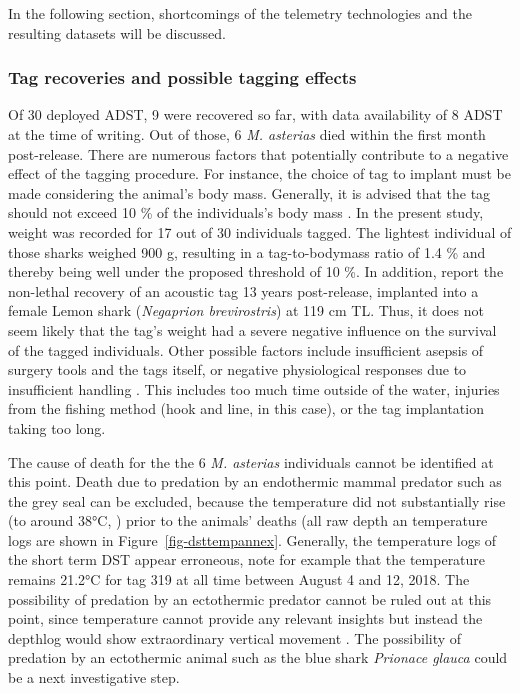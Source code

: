 \documentclass[
  authoryear,
  review,
  3p]{elsarticle}
\begin{document}
In the following section, shortcomings of the telemetry technologies and
the resulting datasets will be discussed.

\hypertarget{sec-disc-tagging-effects}{%
\subsubsection{Tag recoveries and possible tagging
effects}\label{sec-disc-tagging-effects}}

Of 30 deployed ADST, 9 were recovered so far, with data availability of
8 ADST at the time of writing. Out of those, 6 \emph{M. asterias} died
within the first month post-release. There are numerous factors that
potentially contribute to a negative effect of the tagging procedure.
For instance, the choice of tag to implant must be made considering the
animal's body mass. Generally, it is advised that the tag should not
exceed 10 \% of the individuals's body mass \citep{wagner_2011}. In the
present study, weight was recorded for 17 out of 30 individuals tagged.
The lightest individual of those sharks weighed 900 g, resulting in a
tag-to-bodymass ratio of 1.4 \% and thereby being well under the
proposed threshold of 10 \%. In addition, \citet{smukall_2019} report
the non-lethal recovery of an acoustic tag 13 years post-release,
implanted into a female Lemon shark (\emph{Negaprion brevirostris}) at
119 cm TL. Thus, it does not seem likely that the tag's weight had a
severe negative influence on the survival of the tagged individuals.
Other possible factors include insufficient asepsis of surgery tools and
the tags itself, or negative physiological responses due to insufficient
handling \citep{rub_2014}. This includes too much time outside of the
water, injuries from the fishing method (hook and line, in this case),
or the tag implantation taking too long.

The cause of death for the the 6 \emph{M. asterias} individuals cannot
be identified at this point. Death due to predation by an endothermic
mammal predator such as the grey seal can be excluded, because the
temperature did not substantially rise (to around 38°C,
\citet{austin_2006}) prior to the animals' deaths (all raw depth an
temperature logs are shown in Figure~\ref{fig-dsttempannex}. Generally,
the temperature logs of the short term DST appear erroneous, note for
example that the temperature remains 21.2°C for tag 319 at all time
between August 4 and 12, 2018. The possibility of predation by an
ectothermic predator cannot be ruled out at this point, since
temperature cannot provide any relevant insights but instead the
depthlog would show extraordinary vertical movement \citep[see][ for
examples of predation by endothermic versus ectothermic
predators]{seitz_2019}. The possibility of predation by an ectothermic
animal such as the blue shark \emph{Prionace glauca} could be a next
investigative step.
\end{document}

